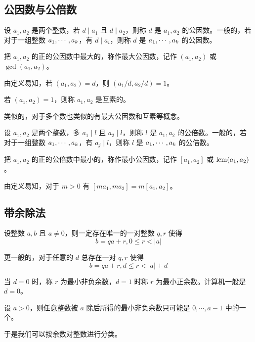\subsection{公因数与公倍数}

\begin{definition}[公因数]
	设 $a_1,a_2$ 是两个整数，若 $d \mid a_1 $ 且 $ d \mid a_2$，则称 $d$ 是 $a_1,a_2$ 的公因数。一般的，若对于一组整数 $a_1,\cdots,a_k$，有 $d \mid a_i$，则称 $d$ 是 $a_1,\cdots,a_k$ 的公因数。
\end{definition}

把 $a_1,a_2$ 的正的公因数中最大的，称作最大公因数，记作 $(a_1,a_2)$ 或 $\gcd(a_1,a_2)$。

由定义易知，若 $(a_1,a_2) = d$，则 $(a_1/d, a_2/d) = 1$。

\begin{definition}[互素]
	若 $(a_1,a_2) = 1$，则称 $a_1,a_2$ 是互素的。
\end{definition}

类似的，对于多个数也类似的有最大公因数和互素等概念。

\begin{definition}[公倍数]
	设 $a_1,a_2$ 是两个整数，多 $a_1 \mid l$ 且 $a_2 \mid l$，则称 $l$ 是 $a_1,a_2$ 的公倍数。一般的，若对于一组整数 $a_1,\cdots,a_k$，有 $a_j \mid l$，则称 $l$ 是 $a_1,\cdots,a_k$ 的公倍数。
\end{definition}

把 $a_1,a_2$ 的正的公倍数中最小的，称作最小公因数，记作 $[a_1,a_2]$ 或 $\operatorname{lcm}(a_1,a_2)$。

由定义易知，对于 $m > 0$ 有 $[ma_1,ma_2] = m[a_1,a_2]$。

\subsection{带余除法}

\begin{theorem}
	设整数 $a,b$ 且 $a \ne 0$，则一定存在唯一的一对整数 $q,r$ 使得
	\[ b = qa + r, 0 \leqslant r < |a| \]
\end{theorem}

更一般的，对于任意的 $d$ 总存在一对 $q,r$ 使得
\[ b = qa + r, d \leqslant r < |a| + d \]

当 $d = 0$ 时，称 $r$ 为最小非负余数，$d = 1$ 时称 $r$ 为最小正余数。计算机一般是 $d = 0$。

\begin{lemma}
	设 $a > 0$，则任意整数被 $a$ 除后所得的最小非负余数只可能是 $0,\cdots,a-1$ 中的一个。
\end{lemma}

于是我们可以按余数对整数进行分类。